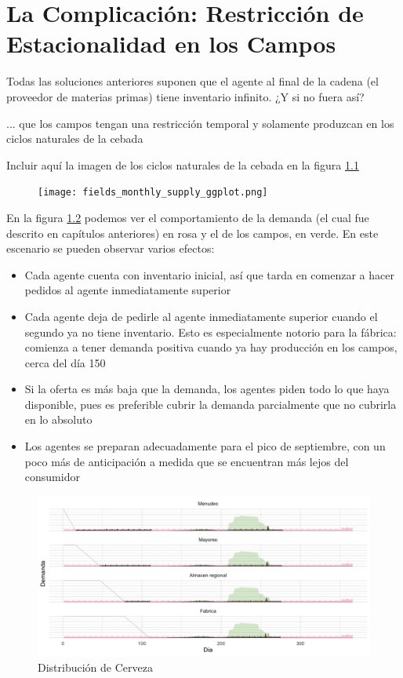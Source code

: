 \chapter{La Complicaci\'on: Restricci\'on de Estacionalidad en los Campos}

Todas las soluciones anteriores suponen que el agente al final de la cadena (el proveedor de materias primas) tiene inventario infinito. ¿Y si no fuera as\'i?

... que los campos tengan una restricci\'on temporal y solamente produzcan en los ciclos naturales de la cebada

Incluir aqu\'i la imagen de los ciclos naturales de la cebada en la figura \ref{fields}

\begin{figure}[h]
\caption{ }
\label{fields}
\texttt{[image: fields\_monthly\_supply\_ggplot.png]}
\centering
\end{figure}

En la figura \ref{analytic_3} podemos ver el comportamiento de la demanda (el cual fue descrito en cap\'itulos anteriores) en rosa y el de los campos, en verde. En este escenario se pueden observar varios efectos: 
\begin{itemize}
    \item Cada agente cuenta con inventario inicial, as\'i que tarda en comenzar a hacer pedidos al agente inmediatamente superior
    \item Cada agente deja de pedirle al agente inmediatamente superior cuando el segundo ya no tiene inventario. Esto es especialmente notorio para la f\'abrica: comienza a tener demanda positiva cuando ya hay producci\'on en los campos, cerca del d\'ia 150
    \item Si la oferta es m\'as baja que la demanda, los agentes piden todo lo que haya disponible, pues es preferible cubrir la demanda parcialmente que no cubrirla en lo absoluto
    \item Los agentes se preparan adecuadamente para el pico de septiembre, con un poco m\'as de anticipaci\'on a medida que se encuentran m\'as lejos del consumidor
\end{itemize}

\begin{figure}[h!]
\caption{Distribuci\'on de Cerveza}
\label{analytic_3}
\includegraphics[width=16cm]{tesis_tex/figs/analytic_with_fields_restriction.png}
\centering
\end{figure}

